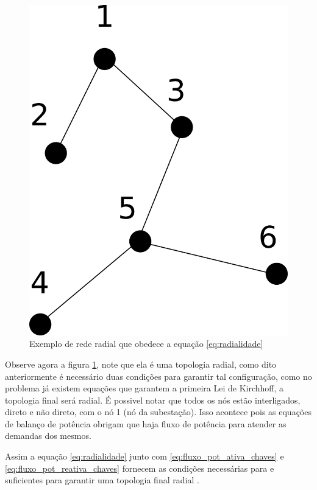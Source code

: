 \begin{figure}[H]
    \centering
    \includegraphics[scale=0.8]{4_Modeling/restricao_radialidade.png}
    \caption{Exemplo de rede radial que obedece a equação \ref{eq:radialidade}}
    \label{fig:radialidade_right}
\end{figure}

Observe agora a figura \ref{fig:radialidade_right}, note que ela é uma topologia radial, como dito anteriormente é necessário duas condições para garantir tal configuração, como no problema já existem equações que garantem a primeira Lei de Kirchhoff, a topologia final será radial. 
É possivel notar que todos os nós estão interligados, direto e não direto, com o nó 1 (nó da subestação).
Isso acontece pois as equações de balanço de potência obrigam que haja fluxo de potência para atender as demandas dos mesmos.

Assim a equação \ref{eq:radialidade} junto com \ref{eq:fluxo_pot_ativa_chaves} e \ref{eq:fluxo_pot_reativa_chaves} fornecem as condições necessárias para e suficientes para garantir uma topologia final radial \cite{Lavorato2012ImposingProblems}.

